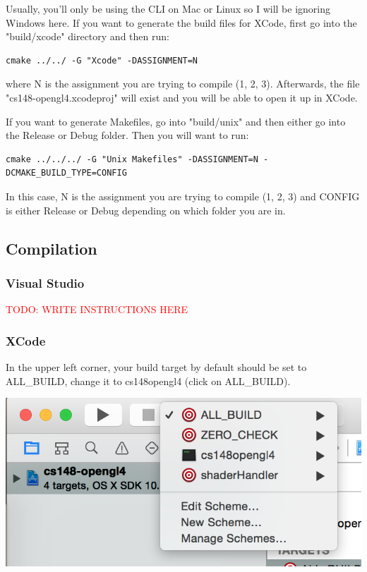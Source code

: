 \documentclass{article}
\begin{document}
Usually, you'll only be using the CLI on Mac or Linux so I will be ignoring Windows here. If you want to generate the build files for XCode, first go into the "build/xcode" directory and then run: 

\begin{lstlisting}
cmake ../../ -G "Xcode" -DASSIGNMENT=N
\end{lstlisting}

where N is the assignment you are trying to compile (1, 2, 3). Afterwards, the file "cs148-opengl4.xcodeproj" will exist and you will be able to open it up in XCode.

If you want to generate Makefiles, go into "build/unix" and then either go into the Release or Debug folder. Then you will want to run:

\begin{lstlisting}
cmake ../../../ -G "Unix Makefiles" -DASSIGNMENT=N -DCMAKE_BUILD_TYPE=CONFIG
\end{lstlisting}

In this case, N is the assignment you are trying to compile (1, 2, 3) and CONFIG is either Release or Debug depending on which folder you are in.

\subsection*{Compilation}

\subsubsection*{Visual Studio}

\textcolor{red}{TODO: WRITE INSTRUCTIONS HERE}

\subsubsection*{XCode}

In the upper left corner, your build target by default should be set to ALL\_BUILD, change it to cs148opengl4 (click on ALL\_BUILD).

\includegraphics[]{xcode1.png}
\end{document}

